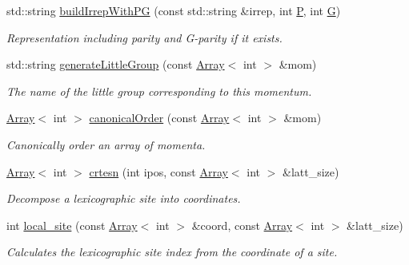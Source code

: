 \begin{DoxyCompactItemize}
std\+::string \mbox{\hyperlink{namespaceHadron_a45b2852ba4456b8729474ced77a3615f}{build\+Irrep\+With\+PG}} (const std\+::string \&irrep, int \mbox{\hyperlink{operator__name__util_8cc_aef94be98e2c9e4a4dece75f60ca9792c}{P}}, int \mbox{\hyperlink{operator__name__util_8cc_ab8735735273b982cc3125e51fe46e2f4}{G}})
\begin{DoxyCompactList}\small\item\em Representation including parity and G-\/parity if it exists. \end{DoxyCompactList}\item 
std\+::string \mbox{\hyperlink{namespaceHadron_a511bab858a88c02ec88a697fd5430e0d}{generate\+Little\+Group}} (const \mbox{\hyperlink{classXMLArray_1_1Array}{Array}}$<$ int $>$ \&mom)
\begin{DoxyCompactList}\small\item\em The name of the little group corresponding to this momentum. \end{DoxyCompactList}\item 
\mbox{\hyperlink{classXMLArray_1_1Array}{Array}}$<$ int $>$ \mbox{\hyperlink{namespaceHadron_a12bd76a337723c31527ee95d46f170d1}{canonical\+Order}} (const \mbox{\hyperlink{classXMLArray_1_1Array}{Array}}$<$ int $>$ \&mom)
\begin{DoxyCompactList}\small\item\em Canonically order an array of momenta. \end{DoxyCompactList}\item 
\mbox{\hyperlink{classXMLArray_1_1Array}{Array}}$<$ int $>$ \mbox{\hyperlink{namespaceHadron_a10fe1c3c465ac8dd8b6edab007aa6ab7}{crtesn}} (int ipos, const \mbox{\hyperlink{classXMLArray_1_1Array}{Array}}$<$ int $>$ \&latt\+\_\+size)
\begin{DoxyCompactList}\small\item\em Decompose a lexicographic site into coordinates. \end{DoxyCompactList}\item 
int \mbox{\hyperlink{namespaceHadron_ab96485b602362d63c3326d4326e3733d}{local\+\_\+site}} (const \mbox{\hyperlink{classXMLArray_1_1Array}{Array}}$<$ int $>$ \&coord, const \mbox{\hyperlink{classXMLArray_1_1Array}{Array}}$<$ int $>$ \&latt\+\_\+size)
\begin{DoxyCompactList}\small\item\em Calculates the lexicographic site index from the coordinate of a site. \end{DoxyCompactList}\item 

\end{DoxyCompactItemize}
